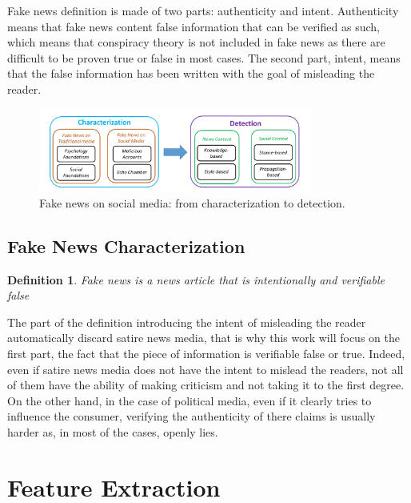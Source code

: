 Fake news definition is made of two parts: authenticity and intent. Authenticity means that fake news content false information that can be verified as such, which means that conspiracy theory is not included in fake news as there are difficult to be proven true or false in most cases. The second part, intent, means that the false information has been written with the goal of misleading the reader. 


\begin{figure}
 \centering
 \includegraphics[width=0.8\textwidth]{images/introduction/characterization.png}
 \caption{Fake news on social media: from characterization to detection.\cite{shu2017fake}}
 \label{fig:intro:characterization}
\end{figure}

\subsection{Fake News Characterization}
\newtheorem{def:fake_news}{Definition}

\begin{def:fake_news}
Fake news is a news article that is intentionally and verifiable false
\end{def:fake_news}

The part of the definition introducing the intent of misleading the reader automatically discard satire news media, that is why this work will focus on the first part, the fact that the piece of information is verifiable false or true. Indeed, even if satire news media does not have the intent to mislead the readers, not all of them have the ability of making criticism and not taking it to the first degree. On the other hand, in the case of political media, even if it clearly tries to influence the consumer, verifying the authenticity of there claims is usually harder as, in most of the cases, openly lies. 

\section{Feature Extraction} \label{intro:feature_extract}
